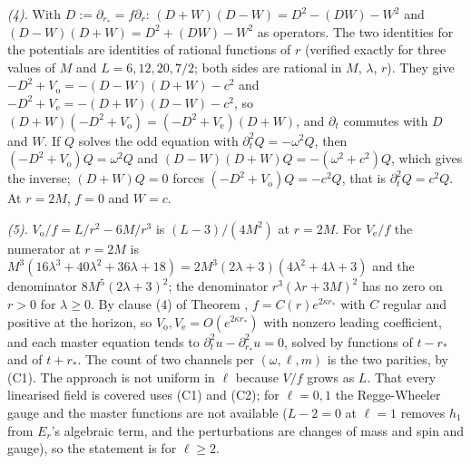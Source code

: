 \emph{(4).} With $D := \partial_{r_{*}} = f\partial_{r}$: $(D + W)(D - W) = D^{2} - (DW) - W^{2}$ and $(D - W)(D + W) = D^{2} + (DW) - W^{2}$ as operators. The two identities for the potentials are identities of rational functions of $r$ (verified exactly for three values of $M$ and $L = 6, 12, 20, 7/2$; both sides are rational in $M$, $\lambda$, $r$). They give $-D^{2} + V_{\mathrm{o}} = -(D - W)(D + W) - c^{2}$ and $-D^{2} + V_{\mathrm{e}} = -(D + W)(D - W) - c^{2}$, so $(D + W)(-D^{2} + V_{\mathrm{o}}) = (-D^{2} + V_{\mathrm{e}})(D + W)$, and $\partial_{t}$ commutes with $D$ and $W$. If $Q$ solves the odd equation with $\partial_{t}^{2}Q = -\omega^{2}Q$, then $(-D^{2} + V_{\mathrm{o}})Q = \omega^{2}Q$ and $(D - W)(D + W)Q = -(\omega^{2} + c^{2})Q$, which gives the inverse; $(D + W)Q = 0$ forces $(-D^{2} + V_{\mathrm{o}})Q = -c^{2}Q$, that is $\partial_{t}^{2}Q = c^{2}Q$. At $r = 2M$, $f = 0$ and $W = c$.

\emph{(5).} $V_{\mathrm{o}}/f = L/r^{2} - 6M/r^{3}$ is $(L - 3)/(4M^{2})$ at $r = 2M$. For $V_{\mathrm{e}}/f$ the numerator at $r = 2M$ is $M^{3}(16\lambda^{3} + 40\lambda^{2} + 36\lambda + 18) = 2M^{3}(2\lambda + 3)(4\lambda^{2} + 4\lambda + 3)$ and the denominator $8M^{5}(2\lambda + 3)^{2}$; the denominator $r^{3}(\lambda r + 3M)^{2}$ has no zero on $r > 0$ for $\lambda \geq 0$. By clause (4) of Theorem , $f = C(r)e^{2\kappa r_{*}}$ with $C$ regular and positive at the horizon, so $V_{\mathrm{o}}, V_{\mathrm{e}} = O(e^{2\kappa r_{*}})$ with nonzero leading coefficient, and each master equation tends to $\partial_{t}^{2}u - \partial_{r_{*}}^{2}u = 0$, solved by functions of $t - r_{*}$ and of $t + r_{*}$. The count of two channels per $(\omega, \ell, m)$ is the two parities, by (C1). The approach is not uniform in $\ell$ because $V/f$ grows as $L$. That every linearised field is covered uses (C1) and (C2); for $\ell = 0, 1$ the Regge-Wheeler gauge and the master functions are not available ($L - 2 = 0$ at $\ell = 1$ removes $h_{1}$ from $E_{r}$'s algebraic term, and the perturbations are changes of mass and spin and gauge), so the statement is for $\ell \geq 2$.

